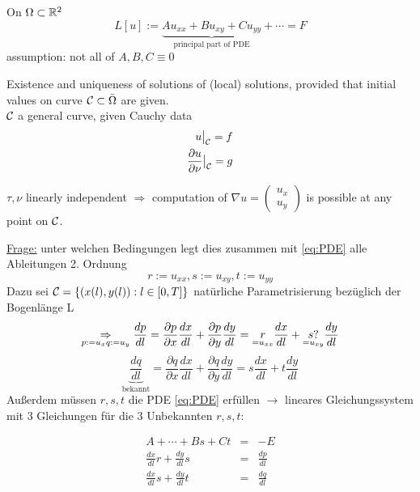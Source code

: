 \begin{bemerkung*}
On $\Omega\subset\mathbb{R}^2$
\begin{equation*}%
    L[u] := \underbrace{Au_{xx} + Bu_{xy} + Cu_{yy}}_{\text{principal part of PDE}} + \cdots = F
    \label{}
\end{equation*}
assumption: not all of $A,B,C \equiv 0$

Existence and uniqueness of solutions of (local) solutions, provided that initial values on curve $\mathcal{C}\subset\bar{\Omega}$ are given.\\
$\mathcal{C}$ a general curve, given Cauchy data 
\begin{eqnarray*}
    u\big|_{\mathcal{C}} = f \\
    \frac{\partial u}{\partial \nu} \big|_{\mathcal{C}} = g
    \label{}
\end{eqnarray*}

$\tau, \nu$ linearly independent $\Rightarrow$ computation of $\nabla u = \begin{pmatrix} u_x\\ u_y\end{pmatrix}$ is possible at any point on $\mathcal{C}$.
\end{bemerkung*}

\underline{Frage:} unter welchen Bedingungen legt dies zusammen mit \eqref{eq:PDE} alle Ableitungen 2. Ordnung 
\begin{equation} %
    r:=u_{xx}, s:=u_{xy}, t:=u_{yy}
    \label{}
\end{equation}
Dazu sei $\mathcal{C} = \left\{ \left( x(l), y(l) \right): l\in [0,T] \right\}$ natürliche Parametrisierung bezüglich der Bogenlänge L
\[
    \underset{p:=u_x\\q:=u_y}{\Rightarrow} \frac{dp}{dl} = \frac{\partial p}{\partial x} \frac{dx}{dl} + \frac{\partial p}{\partial y}\frac{dy}{dl} \\
    = \underset{=u_{xx}}{r} \frac{dx}{dl} + \underset{=u_{xy}}{s?} \frac{dy}{dl}
\]
\[
    \underbrace{\frac{dq}{dl}}_{\text{bekannt}} = \frac{\partial q}{\partial x} \frac{dx}{dl} + \frac{\partial q}{\partial y} \frac{dy}{dl}
    = s \frac{dx}{dl} + t\frac{dy}{dl}
\]
Außerdem müssen $r,s,t$ die PDE \eqref{eq:PDE} erfüllen $\to$ lineares Gleichungssystem mit 3 Gleichungen für die 3 Unbekannten $r,s,t:$

\begin{eqnarray} %
    A+\cdots + Bs + Ct &=&  -E\\
    \frac{dx}{dl} r + \frac{dy}{dl} s &=& \frac{dp}{dl}\\
    \frac{dx}{dl} s + \frac{dy}{dl} t &=& \frac{dq}{dl}
    \label{eq:rst}
\end{eqnarray}

